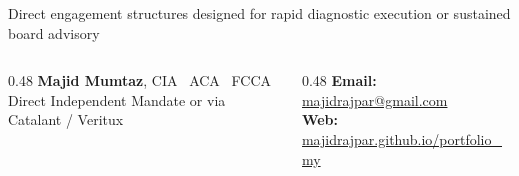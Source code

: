 \documentclass[aspectratio=169, 8pt]{beamer}
\begin{document}
\begin{frame}{Direct engagement structures designed for rapid diagnostic execution or sustained board advisory}
    \vspace{0.35cm}
    \begin{tcolorbox}[colback=obsidian, colframe=obsidian, arc=1pt, boxrule=0pt, left=6pt, right=6pt, top=4pt, bottom=4pt]
        \begin{columns}[c]
            \begin{column}{0.48\textwidth}
                {\normalsize \textbf{\color{pureWhite} Majid Mumtaz}, \textcolor{warmGold}{CIA \textbar\ ACA \textbar\ FCCA}} \\
                {\scriptsize \color{cardBorder} Direct Independent Mandate or via Catalant / Veritux}
            \end{column}
            \begin{column}{0.48\textwidth}
                \raggedleft
                {\footnotesize \color{pureWhite} \textbf{Email:} \href{mailto:majidrajpar@gmail.com}{\color{warmGold}majidrajpar@gmail.com}} \\
                {\footnotesize \color{pureWhite} \textbf{Web:} \href{https://majidrajpar.github.io/portfolio_my}{\color{warmGold}majidrajpar.github.io/portfolio\_my}}
            \end{column}
        \end{columns}
    \end{tcolorbox}
\end{frame}
\end{document}
